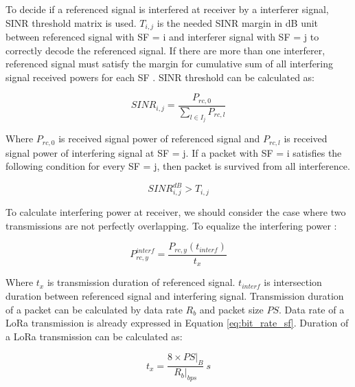 \documentclass[conference]{IEEEtran}
\begin{document}
\par To decide if a referenced signal is interfered at receiver by a interferer signal, SINR threshold matrix is used. $T_{i,j}$ is the needed SINR margin in dB unit between referenced signal with SF = i and interferer signal with SF = j to correctly decode the referenced signal. If there are more than one interferer, referenced signal must satisfy the margin for cumulative sum of all interfering signal received powers for each SF \cite{7996384}. SINR threshold can be calculated as:

\begin{equation} \label{eq:sinr_db}
SINR_{i,j} = \dfrac{P_{rc,0}}{\sum_{l \in I_j} P_{rc,l}}
\end{equation}

\par Where $P_{rc,0}$ is received signal power of referenced signal and $P_{rc,l}$ is received signal power of interfering signal at SF = j. If a packet with SF = i satisfies the following condition for every SF = j, then packet is survived from all interference.

\begin{equation} \label{eq:sinr_t}
SINR_{i,j}^{dB} > T_{i,j}
\end{equation}

\par To calculate interfering power at receiver, we should consider the case where two transmissions are not perfectly overlapping. To equalize the interfering power \cite{7996384}:

\begin{equation} \label{eq:p_interference}
P_{rc,y}^{interf} = \dfrac{P_{rc,y}(t_{interf})}{t_{x}}
\end{equation}

\par Where $t_{x}$ is transmission duration of referenced signal. $t_{interf}$ is intersection duration between referenced signal and interfering signal. Transmission duration of a packet can be calculated by data rate $R_{b}$ and packet size $PS$. Data rate of a LoRa transmission is already expressed in Equation \ref{eq:bit_rate_sf}. Duration of a LoRa transmission can be calculated as:

\begin{equation} \label{eq:transmission_duration}
t_{x} = \dfrac{8 \times PS|_{B}}{R_{b}|_{bps}}  \ s
\end{equation}
\end{document}
